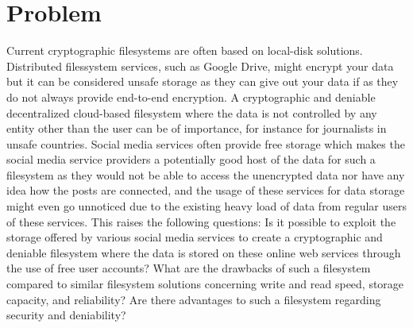 
\section{Problem}
\label{sec:problem}

Current cryptographic filesystems are often based on \mbox{local-disk} solutions. Distributed filessystem services, such as Google Drive, might encrypt your data but it can be considered unsafe storage as they can give out your data if as they do not always provide \mbox{end-to-end} encryption. A cryptographic and deniable decentralized \mbox{cloud-based} filesystem where the data is not controlled by any entity other than the user can be of importance, for instance for journalists in unsafe countries. Social media services often provide free storage which makes the social media service providers a potentially good host of the data for such a filesystem as they would not be able to access the unencrypted data nor have any idea how the posts are connected, and the usage of these services for data storage might even go unnoticed due to the existing heavy load of data from regular users of these services. This raises the following questions: Is it possible to exploit the storage offered by various social media services to create a cryptographic and deniable filesystem where the data is stored on these online web services through the use of free user accounts? What are the drawbacks of such a filesystem compared to similar filesystem solutions concerning write and read speed, storage capacity, and reliability? Are there advantages to such a filesystem regarding security and deniability? 



